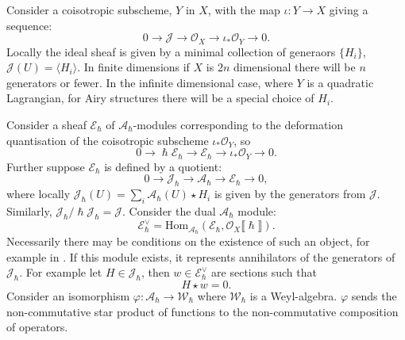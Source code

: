     Consider a coisotropic subscheme, \(Y\) in \(X\), with the map \( \iota : Y \rightarrow X\) giving a sequence:
    \[ 0 \rightarrow \mathcal{J} \rightarrow \mathcal{O}_X \rightarrow \iota_{*}\mathcal{O}_Y \rightarrow 0. \]
    Locally the ideal sheaf is given by a minimal collection of generaors \(\{H_i\}\), \( \mathcal{J}(U) = \langle H_i \rangle \). In finite dimensions if \(X\) is \(2n\) dimensional there will be \(n\) generators or fewer. In the infinite dimensional case, where \(Y\) is a quadratic Lagrangian, for Airy structures there will be a special choice of \(H_i\).
    
    Consider a sheaf \( \mathcal{E}_{\hslash}\) of \( \mathcal{A}_{\hslash}\)-modules corresponding to the deformation quantisation of the coisotropic subscheme \( \iota_{*} \mathcal{O}_Y\), so
    \[ 0 \rightarrow \hslash \mathcal{E}_{\hslash} \rightarrow \mathcal{E}_{\hslash} \rightarrow \iota_{*} \mathcal{O}_Y \rightarrow 0.\]
    Further suppose \( \mathcal{E}_{\hslash}\) is defined by a quotient:
    \begin{equation}
        \label{eqn:exactseqJAE}
        0 \rightarrow \mathcal{J}_{\hslash}   \rightarrow \mathcal{A}_\hslash  \rightarrow \mathcal{E}_\hslash \rightarrow 0,
    \end{equation} 
    where locally \( \mathcal{J}_{\hslash}(U) = \sum_i \mathcal{A}_{\hslash }(U) \star  H_i  \) is given by the generators from \( \mathcal{J}\).
    Similarly, \( \mathcal{J}_{\hslash}/\hslash \mathcal{J}_{\hslash} = \mathcal{J} \). Consider the dual \( \mathcal{A}_{\hslash}\) module:
    \[ \mathcal{E}_{\hslash}^{\vee} = \mathrm{Hom}_{\mathcal{A}_{\hslash}}(\mathcal{E}_{\hslash},\mathcal{O}_X \lBrack \hslash \rBrack ).\]
    Necessarily there may be conditions on the existence of such an object, for example in  \cite[section 2.4, page 15]{abpolyquant}. If this module exists, it represents annihilators of the generators of \( \mathcal{J}_{\hslash}\). For example let \(H \in \mathcal{J}_\hslash\), then  \( w \in \mathcal{E}^{\vee}_{\hslash}\) are sections such that 
    \begin{equation}
        \label{eqn:annih}
        H \star w = 0.
    \end{equation}
    Consider an isomorphism  \( \varphi : \mathcal{A}_{\hslash} \rightarrow \mathcal{W}_{\hslash}\) where \( \mathcal{W}_{\hslash}\) is a Weyl-algebra. \( \varphi\) sends the non-commutative star product of functions to the non-commutative composition of operators.

